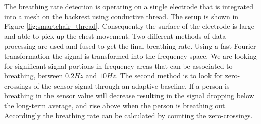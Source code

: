 The breathing rate detection is operating on a single electrode that is integrated into a mesh on the backrest using conductive thread. The setup is shown in Figure \ref{fig:smartchair_thread}. Consequently the surface of the electrode is large and able to pick up the chest movement. Two different methods of data processing are used and fused to get the final breathing rate. Using a fast Fourier transformation the signal is transformed into the frequency space. We are looking for significant signal portions in frequency areas that can be associated to breathing, between $0.2Hz$ and $10Hz$. The second method is to look for zero-crossings of the sensor signal through an adaptive baseline. If a person is breathing in the sensor value will decrease resulting in the signal dropping below the long-term average, and rise above when the person is breathing out. Accordingly the breathing rate can be calculated by counting the zero-crossings.